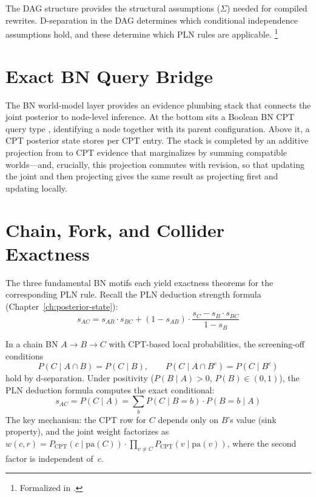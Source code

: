 \documentclass[11pt,openany]{report}
\begin{document}
The DAG structure provides the structural assumptions ($\Sigma$) needed
for compiled rewrites.  D-separation in the DAG determines which
conditional independence assumptions hold, and these determine which
PLN rules are applicable.%
\footnote{Formalized in .}

\section{Exact BN Query Bridge}

The BN world-model layer provides an evidence plumbing stack that
connects the joint posterior to node-level inference.  At the bottom sits
a Boolean BN CPT query type , identifying a node together
with its parent configuration.  Above it, a CPT posterior state
 stores \Evidence{} per CPT entry.  The stack is completed
by an additive projection from \JointEvidence{} to CPT evidence that
marginalizes by summing compatible worlds---and, crucially, this
projection commutes with revision, so that updating the joint and then
projecting gives the same result as projecting first and updating locally.

\section{Chain, Fork, and Collider Exactness}
\label{sec:chain-fork-collider}

The three fundamental BN motifs each yield exactness theorems for the
corresponding PLN rule.  Recall the PLN deduction strength formula
(Chapter~\ref{ch:posterior-state}):
\[
  s_{AC} = s_{AB} \cdot s_{BC} + (1 - s_{AB}) \cdot
  \frac{s_C - s_B \cdot s_{BC}}{1 - s_B}
\]

\begin{theorem}
\label{thm:chain-exact}
In a chain BN $A \to B \to C$ with CPT-based local probabilities,
the screening-off conditions
\[
  P(C \mid A \cap B) = P(C \mid B), \qquad
  P(C \mid A \cap B^c) = P(C \mid B^c)
\]
hold by d-separation.  Under positivity ($P(B \mid A) > 0$, $P(B) \in (0,1)$),
the PLN deduction formula computes the exact conditional:
\[
  s_{AC} = P(C \mid A) = \sum_b P(C \mid B=b) \cdot P(B=b \mid A)
\]
The key mechanism: the CPT row for $C$ depends only on $B$'s value
(sink property), and the joint weight factorizes as
$w(c, r) = P_{\mathrm{CPT}}(c \mid \mathrm{pa}(C)) \cdot
\prod_{v \ne C} P_{\mathrm{CPT}}(v \mid \mathrm{pa}(v))$,
where the second factor is independent of~$c$.
\end{theorem}
\end{document}
